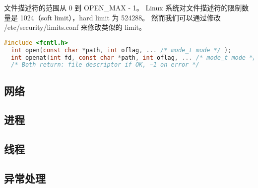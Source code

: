 文件描述符的范围从 0 到 OPEN\_MAX - 1。
Linux 系统对文件描述符的限制数量是 1024（soft limit），hard limit 为 524288。
然而我们可以通过修改 /etc/security/limits.conf 来修改类似的 limit。


\begin{lstlisting}[language=C]
  #include <fcntl.h>
  int open(const char *path, int oflag, ... /* mode_t mode */ );
  int openat(int fd, const char *path, int oflag, ... /* mode_t mode */ );
  /* Both return: file descriptor if OK, −1 on error */
\end{lstlisting}

\subsection{网络}

\subsection{进程}

\subsection{线程}

\subsection{异常处理}
